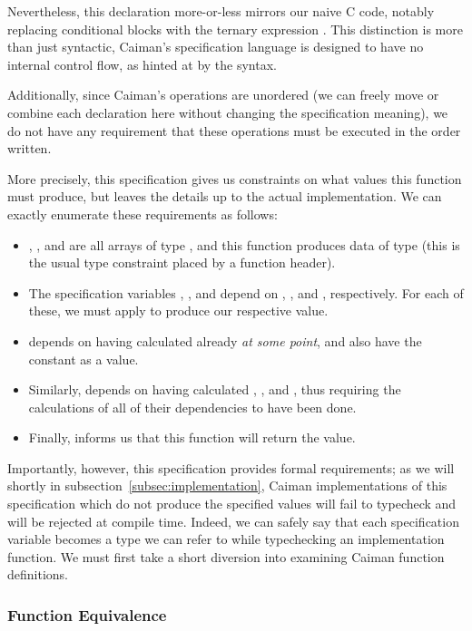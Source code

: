 Nevertheless, this declaration more-or-less mirrors our naive C code, notably replacing conditional  blocks with the ternary expression .  This distinction is more than just syntactic, Caiman's specification language is designed to have no internal control flow, as hinted at by the syntax.

Additionally, since Caiman's operations are unordered (we can freely move or combine each declaration here without changing the specification meaning), we do not have any requirement that these operations must be executed in the order written.

More precisely, this specification gives us constraints on what values this function must produce, but leaves the details up to the actual implementation.  We can exactly enumerate these requirements as follows:
%
\begin{itemize}
\item {}, , and  are all arrays of type , and this function produces data of type  (this is the usual type constraint placed by a function header).
\item The specification variables , , and  depend on , , and , respectively.  For each of these, we must apply  to produce our respective value.
\item {} depends on having calculated  already \textit{at some point}, and also have the constant  as a value.
\item Similarly,  depends on having calculated , , and , thus requiring the calculations of all of their dependencies to have been done.
\item Finally,  informs us that this function will return the  value.
\end{itemize}
%
Importantly, however, this specification provides formal requirements; as we will shortly in subsection~\ref{subsec:implementation}, Caiman implementations of this specification which do not produce the specified values will fail to typecheck and will be rejected at compile time.  Indeed, we can safely say that each specification variable becomes a type we can refer to while typechecking an implementation function.  We must first take a short diversion into examining Caiman function definitions.

\subsubsection{Function Equivalence}
\label{subsec:equivalence}

